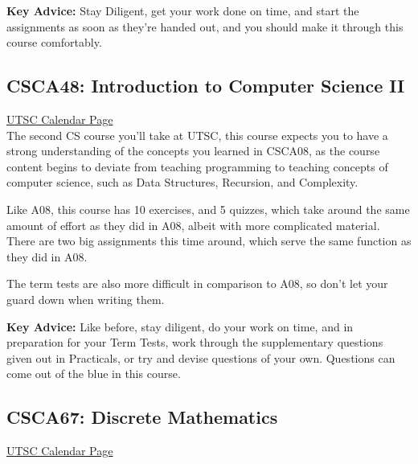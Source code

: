 \documentclass[11pt]{article}
\begin{document}
\textbf{Key Advice:} Stay Diligent, get your work done on time, and start the assignments as soon as they're handed out, and you should make it through this course comfortably.


\subsection{CSCA48: Introduction to Computer Science II}

\href{https://utsc.calendar.utoronto.ca/course/CSCA48H3}{UTSC Calendar Page}\\

The second CS course you'll take at UTSC, this course expects you to have a strong understanding of the concepts you learned in CSCA08, as the course content begins to deviate from teaching programming to teaching concepts of computer science, such as Data Structures, Recursion, and Complexity.\par
Like A08, this course has 10 exercises, and 5 quizzes, which take around the same amount of effort as they did in A08, albeit with more complicated material.  There are two big assignments this time around, which serve the same function as they did in A08.\par
The term tests are also more difficult in comparison to A08, so don't let your guard down when writing them.\par

\textbf{Key Advice:} Like before, stay diligent, do your work on time, and in preparation for your Term Tests, work through the supplementary questions given out in Practicals, or try and devise questions of your own.  Questions can come out of the blue in this course.

\subsection{CSCA67: Discrete Mathematics}

\href{https://utsc.calendar.utoronto.ca/course/CSCA67H3}{UTSC Calendar Page}\\
\end{document}
